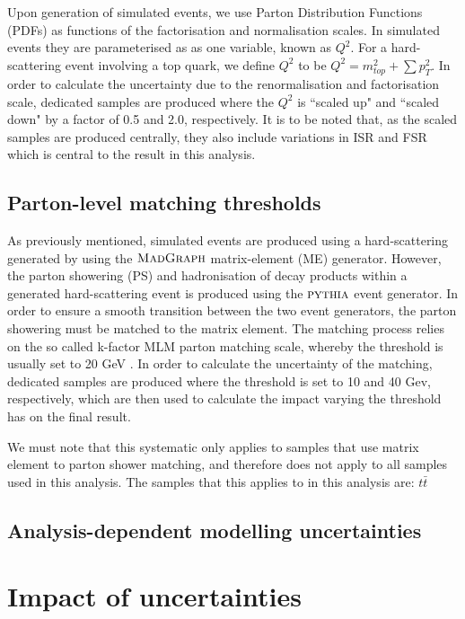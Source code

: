 Upon generation of simulated events, we use Parton Distribution Functions (PDFs) as functions of the factorisation and normalisation scales. In simulated events they are parameterised as as one variable, known as $Q^2$. For a hard-scattering event involving a top quark, we define $Q^2$ to be $Q^2 = m^2_{top} + \sum p^2_T$. In order to calculate the uncertainty due to the renormalisation and factorisation scale, dedicated samples are produced where the $Q^2$ is ``scaled up" and ``scaled down" by a factor of 0.5 and 2.0, respectively. It is to be noted that, as the scaled samples are produced centrally, they also include variations in ISR and FSR which is central to the result in this analysis.

\subsection{Parton-level matching thresholds}

As previously mentioned, simulated events are produced using a hard-scattering generated by using the $\textsc{MadGraph}$ matrix-element (ME) generator. However, the parton showering (PS) and hadronisation of decay products within a generated hard-scattering event is produced using the ${\textsc{pythia}}$ event generator. In order to ensure a smooth transition between the two event generators, the parton showering must be matched to the matrix element. The matching process relies on the so called k-factor MLM parton matching scale, whereby the threshold is usually set to 20 GeV \cite{Mangano:2006rw}. In order to calculate the uncertainty of the matching, dedicated samples are produced where the threshold is set to 10 and 40 Gev, respectively, which are then used to calculate the impact varying the threshold has on the final result.

We must note that this systematic only applies to samples that use matrix element to parton shower matching, and therefore does not apply to all samples used in this analysis. The samples that this applies to in this analysis are: $t\bar{t}$  %

\subsection{Analysis-dependent modelling uncertainties}

\section{Impact of uncertainties}

